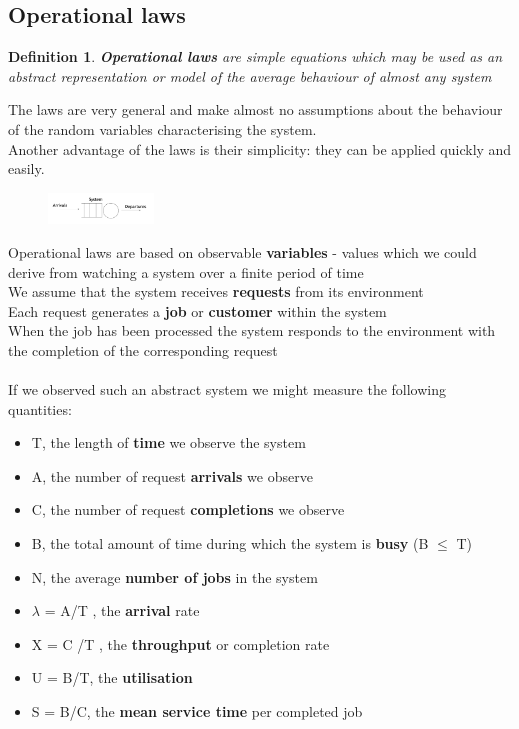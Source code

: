\documentclass[10pt, oneside]{article}
\newtheorem{defn}{Definition}
\begin{document}
\subsection{Operational laws}
\begin{defn}
    {\bf Operational laws} are simple equations which may be used as an abstract representation or model of the average behaviour of almost any system
\end{defn}The laws are very general and make almost no assumptions about the behaviour of the random variables characterising the system.\\Another advantage of the laws is their simplicity: they can be applied quickly and easily.\begin{figure}[H]
    \begin{center}
        \includegraphics[width=0.25\textwidth]{img/img110.png}
        \end{center}
    \end{figure}Operational laws are based on observable {\bf variables} - values which we could derive from watching a system over a finite period of time\\We assume that the system receives {\bf requests} from its environment\\Each request generates a {\bf job} or {\bf customer} within the system\\When the job has been processed the system responds to the environment with the completion of the corresponding request\\\\If we observed such an abstract system we might measure the following quantities:\begin{itemize}
        \item T, the length of {\bf time} we observe the system
        \item  A, the number of request {\bf arrivals} we observe
        \item  C, the number of request {\bf completions} we observe
        \item  B, the total amount of time during which the system is {\bf busy} (B $\leq$ T) 
        \item  N, the average {\bf number of jobs} in the system
    \end{itemize}
    \begin{itemize}
        \item $\lambda$ = A/T , the {\bf arrival} rate
        \item X = C /T , the {\bf throughput} or completion rate
        \item U = B/T, the {\bf utilisation}
        \item S = B/C, the {\bf mean service time} per completed job
    \end{itemize}
\end{document}
